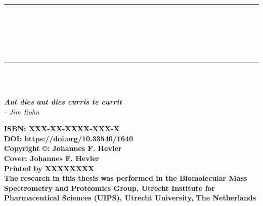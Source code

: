 \cleardoublepage
\pagestyle{empty} %
\frontmatter %

\begin{titlepage}
    \begin{center}
        \rule{\textwidth}{1.5pt}\\[0cm]
        {\huge \bfseries \thesistitle \par \ }\\[-0.5cm]
        \rule{\textwidth}{1.5pt}\\[2.5cm]
        {\large \bfseries\name}\\
        [2cm]
        \begin{small}
            \emph{\textbf{Aut dies aut dies curris te currit} \\
                - Jim Rohn}
        \end{small}
    \end{center}
    \clearpage
    \begin{flushleft}
        \vspace*{\fill}

        {\small \textbf{ISBN: XXX-XX-XXXX-XXX-X}\\
        \textbf{DOI: https://doi.org/10.33540/1640}\\
        [0.5cm]
        \textbf{Copyright ©: Johannes F. Hevler}\\
        \textbf{Cover: Johannes F. Hevler}\\
        \textbf{Printed by XXXXXXXX}\\
        [0.5cm]
        \textbf{The research in this thesis was performed in the Biomolecular Mass
            Spectrometry and Proteomics Group, Utrecht Institute for Pharmaceutical Sciences (UIPS), Utrecht University, The Netherlands}}

    \end{flushleft}
    \clearpage


\end{titlepage}
